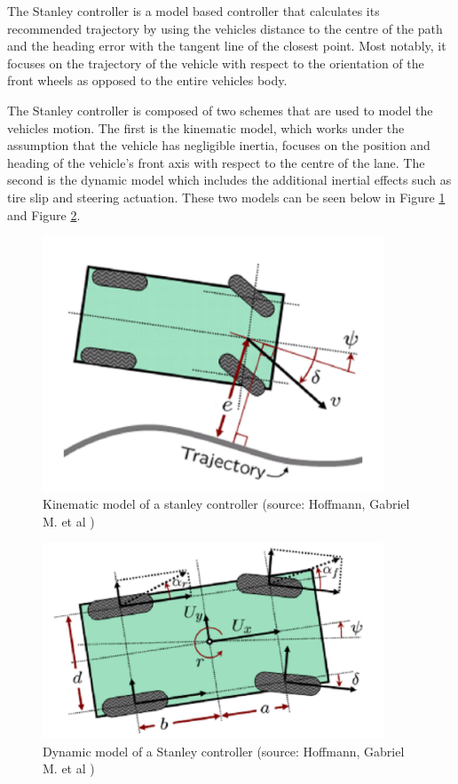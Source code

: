 \documentclass[titlepage, draft]{article}
\begin{document}
{The Stanley controller is a model based controller that calculates its recommended trajectory by using the vehicles distance to the centre of the path and the heading error with the tangent line of the closest point. Most notably, it focuses on the trajectory of the vehicle with respect to the orientation of the front wheels as opposed to the entire vehicles body\cite{4282788}.

The Stanley controller is composed of two schemes that are used to model the vehicles motion. The first is the kinematic model, which works under the assumption that the vehicle has negligible inertia, focuses on the position and heading of the vehicle's front axis with respect to the centre of the lane. The second is the dynamic model which includes the additional inertial effects such as tire slip and steering actuation. These two models can be seen below in Figure \ref{fig:stankine} and Figure \ref{fig:standyna}.

\begin{figure}
	\centering
	\includegraphics[width=4in]{stanley_kinematic}
	\caption{Kinematic model of a stanley controller (source: Hoffmann, Gabriel M. et al \cite{4282788})}
	\label{fig:stankine}
\end{figure}

\begin{figure}
	\centering
	\includegraphics[width=4in]{stanley_dynamic}
	\caption{Dynamic model of a Stanley controller (source: Hoffmann, Gabriel M. et al \cite{4282788})}
	\label{fig:standyna}
\end{figure}

}
\end{document}
